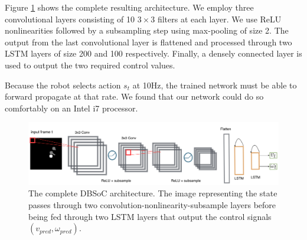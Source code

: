 \documentclass[letterpaper, 10 pt, conference]{ieeeconf}
\begin{document}
Figure \ref{fig:arch} shows the complete resulting architecture. We employ three convolutional layers consisting of 10 $3 \times 3$ filters at each layer. We use ReLU nonlinearities followed by a subsampling step using max-pooling of size 2. The output from the last convolutional layer is flattened and processed through two LSTM layers of size 200 and 100 respectively. Finally, a densely connected layer is used to output the two required control values. 

Because the robot selects action $s_t$ at 10Hz, the trained network must be able to forward propagate at that rate.  We found that our network could do so comfortably on an Intel i7 processor.


  	\begin{figure}[tbh]
	\centering
    \includegraphics[scale = 0.21]{images/arch.png}
  \caption{The complete DBSoC architecture. The image representing the state passes through two convolution-nonlinearity-subsample layers before being fed through two LSTM layers that output the control signals $(v_{pred},\omega_{pred})$. }

    \vspace{-2mm}
  \label{fig:arch}
  \end{figure}

\end{document}
